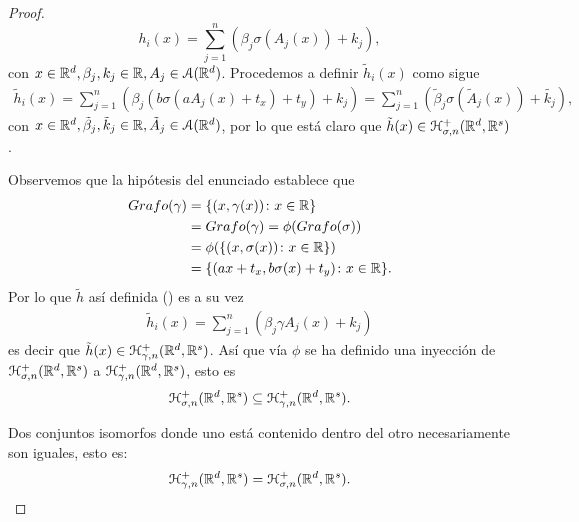 \begin{aportacionOriginal}
\begin{proof}
    \begin{equation*}
        h_i(x) = \sum^n_{j=1}(\beta_{j} \sigma(A_j(x))+ k_j),
    \end{equation*}
    con $x \in \mathbb{R}^d, \beta_{j}, k_j \in \mathbb{R}, A_j \in \mathcal{A}(\mathbb{R}^d)$. 
    Procedemos a definir $\tilde{h}_i(x)$ como sigue 
    \begin{align}\label{eq:h-tilda-definition}
        \tilde{h}_i(x) 
        = \sum^n_{j=1}(\beta_{j}  (b \sigma( a A_j(x) + t_x) + t_y)+ k_j)
        = \sum^n_{j=1}(\tilde{\beta}_{j} \sigma(\tilde{A}_j(x))+ \tilde{k_j}),
    \end{align}
    con $x \in \mathbb{R}^d, \tilde \beta_{j}, \tilde k_j \in \mathbb{R}, \tilde{A}_j \in \mathcal{A}(\mathbb{R}^d)$,
    por lo que está claro que $\tilde{h}(x) \in \mathcal{H}^+_{\sigma, n}(\mathbb{R}^d, \mathbb{R}^s)$. 
 
    Observemos que la 
    hipótesis del enunciado 
    establece que
    \begin{align}
        Grafo(\gamma) &= \{ (x, \gamma(x)) \colon x \in \mathbb{R} \} 
        \\
        & = 
        Grafo(\gamma)  = \phi(Grafo(\sigma)) 
        \\
        & = 
        \phi( \{ (x, \sigma(x)) \colon x \in \mathbb{R} \})
        \\
        &=
        \{ (a x + t_x, b \sigma(x) + t_y) \colon x \in \mathbb{R} \}.
    \end{align}
    Por lo que $\tilde{h}$ así definida ()
    es a su vez 
    \begin{align}
        \tilde{h}_i(x) 
        = \sum^n_{j=1}(\beta_{j}  \gamma A_j(x)+ k_j)
    \end{align}
     es decir que $\tilde{h}(x) \in \mathcal{H}^+_{\gamma, n}(\mathbb{R}^d, \mathbb{R}^s)$. 
    Así que vía $\phi$ se ha definido una inyección 
    de $\mathcal{H}^+_{\sigma, n}(\mathbb{R}^d, \mathbb{R}^s)$ a 
    $\mathcal{H}^+_{\gamma, n}(\mathbb{R}^d, \mathbb{R}^s)$, 
    esto es 
    \begin{equation}
        \mathcal{H}^+_{\sigma, n}(\mathbb{R}^d, \mathbb{R}^s)
        \subseteq
        \mathcal{H}^+_{\gamma, n}(\mathbb{R}^d, \mathbb{R}^s).  
    \end{equation}

    Dos conjuntos isomorfos donde uno está contenido 
    dentro del otro necesariamente son iguales, esto es:
    \begin{equation*}
        \mathcal{H}^+_{\gamma, n}(\mathbb{R}^d, \mathbb{R}^s) 
        = 
        \mathcal{H}^+_{\sigma, n}(\mathbb{R}^d, \mathbb{R}^s).
    \end{equation*}
    

\end{proof}
\end{aportacionOriginal}
